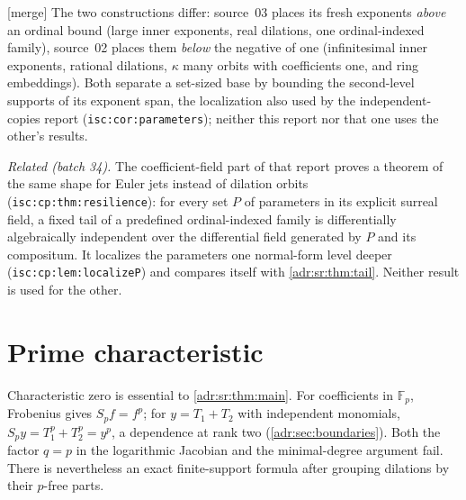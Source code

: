 \documentclass[11pt,letterpaper]{article}
\numberwithin{equation}{section}
\theoremstyle{definition}
\theoremstyle{remark}
\newcommand{\lbl}[1]{\nolinkurl{#1}}%
\newcommand{\mtag}{\textup{[merge]}}%
\begin{document}
\mtag{} The two constructions differ: source~03 places its fresh exponents
\emph{above} an ordinal bound (large inner exponents, real dilations, one
ordinal-indexed family), source~02 places them \emph{below} the negative of
one (infinitesimal inner exponents, rational dilations, $\kappa$ many orbits
with coefficients one, and ring embeddings). Both separate a set-sized base by
bounding the second-level supports of its exponent span, the localization
also used by the independent-copies report (\lbl{isc:cor:parameters}); neither
this report nor that one uses the other's results.

\emph{Related (batch 34).} The coefficient-field part of that report proves
a theorem of the same shape for Euler jets instead of dilation orbits
(\lbl{isc:cp:thm:resilience}): for every set $P$ of parameters in its
explicit surreal field, a fixed tail of a predefined ordinal-indexed family
is differentially algebraically independent over the differential field
generated by $P$ and its compositum. It localizes the parameters one
normal-form level deeper (\lbl{isc:cp:lem:localizeP}) and compares itself
with \cref{adr:sr:thm:tail}. Neither result is used for the other.

\section{Prime characteristic}
\label{adr:sr:sec:charp}

Characteristic zero is essential to \cref{adr:sr:thm:main}. For coefficients
in $\mathbb F_p$, Frobenius gives $S_pf=f^p$; for $y=T_1+T_2$ with independent
monomials, $S_py=T_1^p+T_2^p=y^p$, a dependence at rank two
(\cref{adr:sec:boundaries}). Both the factor $q=p$ in the logarithmic
Jacobian and the minimal-degree argument fail. There is nevertheless an exact
finite-support formula after grouping dilations by their $p$-free parts.
\end{document}
